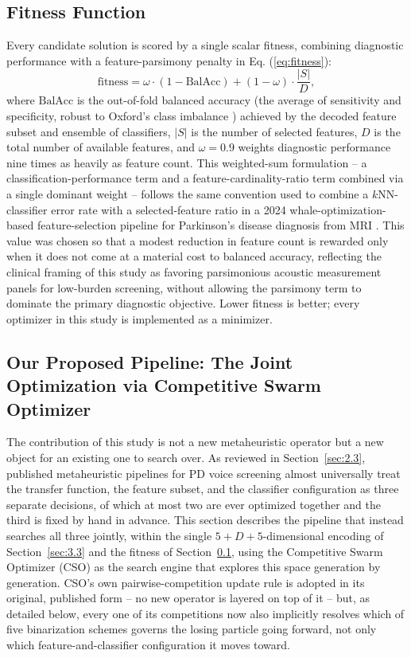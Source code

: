 \subsection{Fitness Function}
\label{sec:3.5}

Every candidate solution is scored by a single scalar fitness, combining diagnostic performance with a feature-parsimony penalty in Eq. (\ref{eq:fitness}):
\begin{equation}
  \text{fitness} = \omega \cdot (1 - \text{BalAcc}) + (1 - \omega) \cdot \frac{|S|}{D},
  \label{eq:fitness}
\end{equation}
where $\text{BalAcc}$ is the out-of-fold balanced accuracy (the average of sensitivity and specificity, robust to Oxford's class imbalance \cite{Brodersen:2010}) achieved by the decoded feature subset and ensemble of classifiers, $|S|$ is the number of selected features, $D$ is the total number of available features, and $\omega = 0.9$ weights diagnostic performance nine times as heavily as feature count. This weighted-sum formulation -- a classification-performance term and a feature-cardinality-ratio term combined via a single dominant weight -- follows the same convention used to combine a $k$NN-classifier error rate with a selected-feature ratio in a 2024 whale-optimization-based feature-selection pipeline for Parkinson's disease diagnosis from MRI \cite{Priyadharshini:2024}. This value was chosen so that a modest reduction in feature count is rewarded only when it does not come at a material cost to balanced accuracy, reflecting the clinical framing of this study as favoring parsimonious acoustic measurement panels for low-burden screening, without allowing the parsimony term to dominate the primary diagnostic objective. Lower fitness is better; every optimizer in this study is implemented as a minimizer.

\subsection{Our Proposed Pipeline: The Joint Optimization via Competitive Swarm Optimizer}
\label{sec:3.6}

The contribution of this study is not a new metaheuristic operator but a
new object for an existing one to search over. As reviewed in
Section~\ref{sec:2.3}, published metaheuristic pipelines for PD voice
screening almost universally treat the transfer function, the feature
subset, and the classifier configuration as three separate decisions, of
which at most two are ever optimized together and the third is fixed by
hand in advance. This section describes the pipeline that instead
searches all three jointly, within the single $5+D+5$-dimensional
encoding of Section~\ref{sec:3.3} and the fitness of Section~\ref{sec:3.5},
using the Competitive Swarm Optimizer (CSO) \cite{Cheng:2015} as the
search engine that explores this space generation by generation. CSO's
own pairwise-competition update rule is adopted in its original,
published form -- no new operator is layered on top of it -- but, as
detailed below, every one of its competitions now also implicitly
resolves which of five binarization schemes governs the losing particle
going forward, not only which feature-and-classifier configuration it
moves toward.

